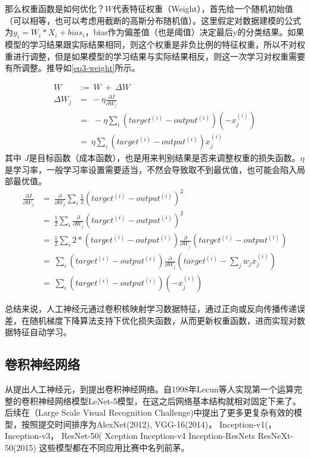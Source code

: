 那么权重函数是如何优化？$W $代表特征权重（Weight），首先给一个随机初始值（可以相等，也可以考虑用截断的高斯分布随机值）。这里假定对数据建模的公式为$y_i = W_i*X_i + bias_i$，bias作为偏差值（也是阈值）决定最后y的分类结果。如果模型的学习结果跟实际结果相同，则这个权重是非负比例的特征权重，所以不对权重进行调整，但是如果模型的学习结果与实际结果相反，则这一次学习对权重需要有所调整。推导如\ref{eq3-weight}所示。

\begin{align}
 W     &:=\  W\ +\ \Delta W     \label{eq3-weight}  \\
 \Delta W_j &=\  -\eta \frac{\partial J}{\partial W_j}\ \nonumber \\
 &=\  \ -\eta \sum_i (target^{(i)} - output^{(i)})(-x_j^{(i)})  \nonumber     \\
 &=\  \eta \sum_i (target^{(i)} - output^{(i)})x_j^{(i)}
\end{align}
其中 $J$是目标函数（成本函数），也是用来判别结果是否来调整权重的损失函数。$\eta$是学习率，一般学习率设置需要适当，不然会导致取不到最优值，也可能会陷入局部最优值。
\begin{align}
  \frac{\partial J}{\partial W_j} &=\  \frac{\partial}{\partial W_j} \sum_i \frac{1}{2} (target^{(i)} - output^{(i)})^2\ \nonumber \\
 &=\    \frac{1}{2}  \sum_i \frac{\partial}{\partial W_j} (target^{(i)} - output^{(i)})^2   \nonumber     \\
 &=\  \frac{1}{2}  \sum_i 2 * (target^{(i)} - output^{(i)})\frac{\partial}{\partial W_j} (target^{(i)} - output^{(i)}) \nonumber \\
 &=\   \sum_i  (target^{(i)} - output^{(i)})\frac{\partial}{\partial W_j} (target^{(i)} - \sum_j w_j x_j^{(i)})  \nonumber \\
 &=\   \sum_i (target^{(i)} - output^{(i)})(-x_j^{(i)})
\end{align}

总结来说，人工神经元通过卷积核映射学习数据特征，通过正向或反向传播传递误差，在随机梯度下降算法支持下优化损失函数，从而更新权重函数，进而实现对数据特征自动学习。

\subsection{卷积神经网络}
从提出人工神经元，到提出卷积神经网络。自1998年Lecun等人\cite{lecun2015lenet}实现第一个运算完整的卷积神经网络模型LeNet-5模型，在这之后网络基本结构就相对固定下来了。后续在（Large Scale Visual Recognition Challenge)中提出了更多更复杂有效的模型，按照提交时间排序为AlexNet(2012)\cite{krizhevsky2012imagenet},
VGG-16(2014)，
Inception-v1(，
Inception-v3，
ResNet-50(
Xception
Inception-v4
Inception-ResNets
ResNeXt-50(2015)
这些模型都在不同应用比赛中名列前茅。

